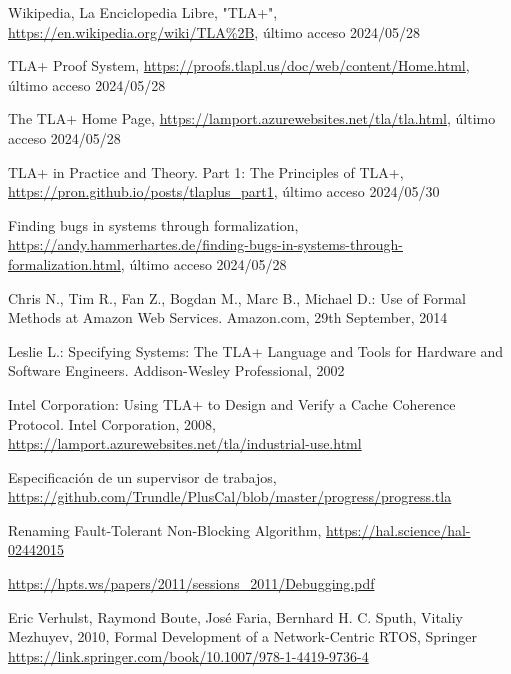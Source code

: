\documentclass[runningheads]{llncs}
\begin{document}
\begin{thebibliography}{8}
Wikipedia, La Enciclopedia Libre, "TLA+", \url{https://en.wikipedia.org/wiki/TLA%2B}, último acceso 2024/05/28

TLA+ Proof System, \url{https://proofs.tlapl.us/doc/web/content/Home.html}, último acceso 2024/05/28

The TLA+ Home Page, \url{https://lamport.azurewebsites.net/tla/tla.html}, último acceso 2024/05/28

TLA+ in Practice and Theory. Part 1: The Principles of TLA+, \url{https://pron.github.io/posts/tlaplus_part1}, último acceso 2024/05/30

Finding bugs in systems through formalization, \url{https://andy.hammerhartes.de/finding-bugs-in-systems-through-formalization.html}, último acceso 2024/05/28

Chris N., Tim R., Fan Z., Bogdan M., Marc B., Michael D.: Use of Formal Methods at Amazon Web Services. Amazon.com, 29th September, 2014

Leslie L.: Specifying Systems: The TLA+ Language and Tools for Hardware and Software Engineers. Addison-Wesley Professional, 2002

Intel Corporation: Using TLA+ to Design and Verify a Cache Coherence Protocol. Intel Corporation, 2008,
\url{https://lamport.azurewebsites.net/tla/industrial-use.html}

Especificación de un supervisor de trabajos,
\url{https://github.com/Trundle/PlusCal/blob/master/progress/progress.tla}

Renaming Fault-Tolerant Non-Blocking Algorithm,
\url{https://hal.science/hal-02442015}

\url{https://hpts.ws/papers/2011/sessions_2011/Debugging.pdf}

Eric Verhulst, Raymond Boute, José Faria,
Bernhard H. C. Sputh, Vitaliy Mezhuyev, 2010, Formal Development of a Network-Centric RTOS, Springer
\url{https://link.springer.com/book/10.1007/978-1-4419-9736-4}
\end{thebibliography}
\end{document}
